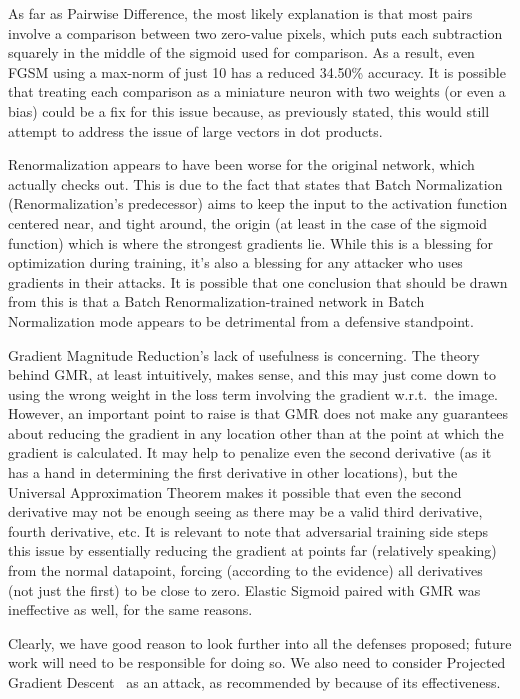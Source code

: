 As far as Pairwise Difference, the most likely explanation is that most pairs involve a comparison
between two zero-value pixels, which puts each subtraction squarely in the middle of the sigmoid
used for comparison. As a result, even FGSM using a max-norm of just 10 has a reduced 34.50\%
accuracy. It is possible that treating each comparison as a miniature neuron with two weights (or
even a bias) could be a fix for this issue because, as previously stated, this would still attempt
to address the issue of large vectors in dot products.

Renormalization appears to have been worse for the original network, which actually checks out. This
is due to the fact that \cite{ioffe2015batch} states that Batch Normalization~\cite{ioffe2015batch}
(Renormalization's predecessor) aims to keep the input to the activation function centered near, and
tight around, the origin (at least in the case of the sigmoid function) which is where the strongest
gradients lie. While this is a blessing for optimization during training, it's also a blessing for
any attacker who uses gradients in their attacks. It is possible that one conclusion that should be
drawn from this is that a Batch Renormalization-trained network in Batch Normalization mode appears
to be detrimental from a defensive standpoint.

Gradient Magnitude Reduction's lack of usefulness is concerning. The theory behind GMR, at least
intuitively, makes sense, and this may just come down to using the wrong weight in the loss term
involving the gradient w.r.t.\ the image. However, an important point to raise is that GMR does not
make any guarantees about reducing the gradient in any location other than at the point at which the
gradient is calculated. It may help to penalize even the second derivative (as it has a hand in
determining the first derivative in other locations), but the Universal Approximation
Theorem\cite{HORNIK1989359} makes it possible that even the second derivative may not be enough
seeing as there may be a valid third derivative, fourth derivative, etc. It is relevant to note that
adversarial training side steps this issue by essentially reducing the gradient at points far
(relatively speaking) from the normal datapoint, forcing (according to the evidence) all derivatives
(not just the first) to be close to zero. Elastic Sigmoid paired with GMR was ineffective as well,
for the same reasons.

Clearly, we have good reason to look further into all the defenses proposed; future work will need
to be responsible for doing so. We also need to consider Projected Gradient
Descent~\cite{madry2019deep} as an attack, as recommended by \cite{athalye2018obfuscated} because of
its effectiveness.